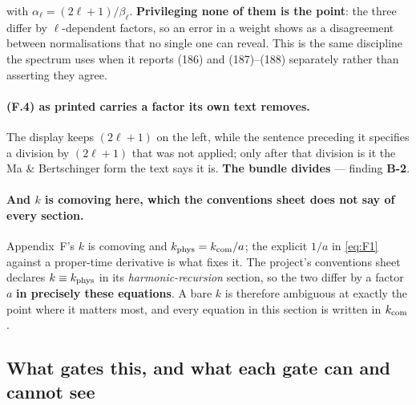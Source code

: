 \noindent
with $\alpha_\ell=(2\ell+1)/\beta_\ell$. \textbf{Privileging none of them is
the point}: the three differ by $\ell$-dependent factors, so an error in a
weight shows as a disagreement between normalisations that no single one can
reveal. This is the same discipline the spectrum uses when it reports (186)
and (187)--(188) separately rather than asserting they agree.

\paragraph{(F.4) as printed carries a factor its own text removes.} The
display keeps $(2\ell+1)$ on the left, while the sentence preceding it
specifies a division by $(2\ell+1)$ that was not applied; only after that
division is it the Ma \& Bertschinger form the text says it is. \textbf{The
bundle divides} --- finding \textbf{B-2}.

\paragraph{And $k$ is comoving here, which the conventions sheet does not say
of every section.} Appendix~F's $k$ is comoving and
$k_{\rm phys}=k_{\rm com}/a$; the explicit $1/a$ in \eqref{eq:F1} against a
proper-time derivative is what fixes it. The project's conventions sheet
declares $k\equiv k_{\rm phys}$ in its \emph{harmonic-recursion} section, so
the two differ by a factor $a$ \textbf{in precisely these equations}. A bare
$k$ is therefore ambiguous at exactly the point where it matters most, and
every equation in this section is written in $k_{\rm com}$.

\subsection{What gates this, and what each gate can and cannot see}

